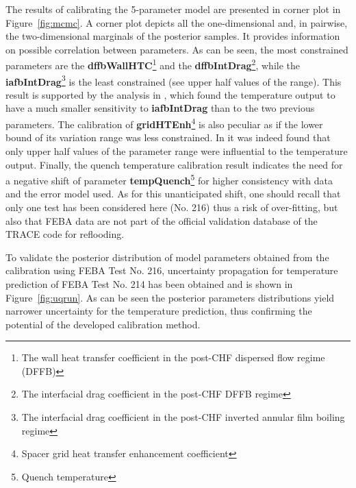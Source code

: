 \documentclass[11pt,titlepage]{article}
\begin{document}
The results of calibrating the 5-parameter model are presented in corner 
plot in Figure~\ref{fig:mcmc}. 
A corner plot depicts all the one-dimensional 
and, in pairwise, the two-dimensional marginals of the posterior samples. 
It provides information on possible correlation between parameters. 
As can be seen, the most constrained parameters are the 
\textbf{dffbWallHTC}\footnote{The wall heat transfer coefficient in the post-CHF dispersed flow regime (DFFB)}  
and the \textbf{dffbIntDrag}\footnote{The interfacial drag coefficient in the post-CHF DFFB regime}, 
while the \textbf{iafbIntDrag}\footnote{The interfacial drag coefficient in the post-CHF inverted annular film boiling regime} 
is the least constrained (see upper half values of the range).
This result is supported by the analysis in \cite{Wicaksono2016a}, 
which found the temperature output to have a much smaller sensitivity to 
\textbf{iafbIntDrag} than to the two previous parameters. 
The calibration of \textbf{gridHTEnh}\footnote{Spacer grid heat transfer enhancement coefficient} 
is also peculiar as if the lower bound of its variation range was less 
constrained.
In \cite{Wicaksono2016} it was indeed found that only upper half values of 
the parameter range were influential to the temperature output. 
Finally, the quench temperature calibration result indicates the need for a 
negative shift of parameter \textbf{tempQuench}\footnote{Quench temperature} 
for higher consistency with data and the error model used. 
As for this unanticipated shift, one should recall that only one test 
has been considered here (No. 216) thus a risk of over-fitting, 
but also that FEBA data are not part of the official validation database of 
the TRACE code for reflooding. 

To validate the posterior distribution of model parameters obtained from the 
calibration using FEBA Test No. 216, uncertainty propagation for temperature 
prediction of FEBA Test No. 214 has been obtained and is shown in 
Figure~\ref{fig:uqrun}. 
As can be seen the posterior parameters distributions yield narrower 
uncertainty for the temperature prediction, thus confirming the potential 
of the developed calibration method.
\end{document}
